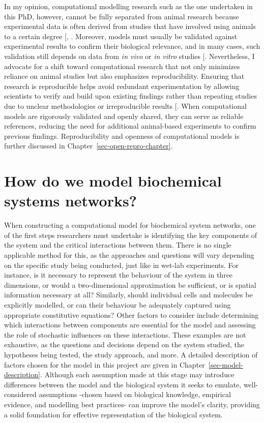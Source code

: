 \documentclass[
  11pt,
  letterpaper,
]{scrreprt}
\begin{document}
In my opinion, computational modelling research such as the one
undertaken in this PhD, however, cannot be fully separated from animal
research because experimental data is often derived from studies that
have involved using animals to a certain degree
{[},
\citeproc{ref-mukherjee2022Role}{259}{]}. Moreover, models must usually
be validated against experimental results to confirm their biological
relevance, and in many cases, such validation still depends on data from
\emph{in vivo} or \emph{in vitro} studies
{[}\citeproc{ref-madden2020Review}{260}{]}. Nevertheless, I advocate for
a shift toward computational research that not only minimizes reliance
on animal studies but also emphasizes reproducibility. Ensuring that
research is reproducible helps avoid redundant experimentation by
allowing scientists to verify and build upon existing findings rather
than repeating studies due to unclear methodologies or irreproducible
results {[}\citeproc{ref-pound2004Where}{261}{]}. When computational
models are rigorously validated and openly shared, they can serve as
reliable references, reducing the need for additional animal-based
experiments to confirm previous findings. Reproducibility and openness
of computational models is further discussed in
Chapter~\ref{sec-open-repro-chapter}.

\section{How do we model biochemical systems
networks?}\label{sec-how-do-we-model}

When constructing a computational model for biochemical system networks,
one of the first steps researchers must undertake is identifying the key
components of the system and the critical interactions between them.
There is no single applicable method for this, as the approaches and
questions will vary depending on the specific study being conducted,
just like in wet-lab experiments. For instance, is it necessary to
represent the behaviour of the system in three dimensions, or would a
two-dimensional approximation be sufficient, or is spatial information
necessary at all? Similarly, should individual cells and molecules be
explicitly modelled, or can their behaviour be adequately captured using
appropriate constitutive equations? Other factors to consider include
determining which interactions between components are essential for the
model and assessing the role of stochastic influences on these
interactions. These examples are not exhaustive, as the questions and
decisions depend on the system studied, the hypotheses being tested, the
study approach, and more. A detailed description of factors chosen for
the model in this project are given in
Chapter~\ref{sec-model-description}. Although each assumption made at
this stage may introduce differences between the model and the
biological system it seeks to emulate, well-considered assumptions
-chosen based on biological knowledge, empirical evidence, and modelling
best practices- can improve the model's clarity, providing a solid
foundation for effective representation of the biological system.
\end{document}

